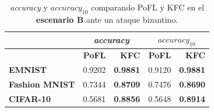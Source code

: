 \begin{table}[h!]
\centering
\begin{tabular}{lrrrr}
\toprule
 & \multicolumn{2}{c}{\textit{accuracy}} & \multicolumn{2}{c}{\textit{$accuracy_{10}$}}   \\
 \toprule
\textbf{}     & \textbf{PoFL}    & \textbf{KFC} & \textbf{PoFL}    & \textbf{KFC} \\ 
\midrule
\textbf{EMNIST}        &   0.9202&  \textbf{0.9881}& 0.9120& \textbf{0.9881}\\ 
\midrule
\textbf{Fashion MNIST}&    0.7344& \textbf{0.8709}&  0.7476&   \textbf{0.8690}\\ 
\midrule
\textbf{CIFAR-10}      & 0.5681& \textbf{0.8856}& 0.5648& \textbf{0.8914}\\
\bottomrule
\end{tabular}
    \caption{\textit{accuracy} y \textit{$accuracy_{10}$} comparando PoFL y KFC en el \textbf{escenario B} ante un ataque bizantino.}  \label{tab:kfcbyzantine_b}

\end{table}


